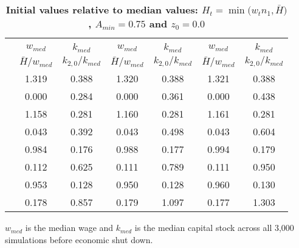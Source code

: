 \documentclass[letterpaper,12pt]{article}
\theoremstyle{definition}
\begin{document}
\begin{spacing}{1.5}
  \begin{table}[htbp]\centering\captionsetup{width=5.3in}
  \caption{\label{TabInitVal_A75}\textbf{Initial values relative to median values: $H_t = \min\bigl(w_t n_1, \bar{H}\bigr)$, $A_{min}=0.75$ and $z_0=0.0$}}
    \begin{threeparttable}
    \begin{tabular}{>{\small}c| >{\small}c >{\small}c| >{\small}c >{\small}c| >{\small}c >{\small}c}
      \hline\hline
      & \multicolumn{2}{c}{$k_{2,0}=0.11$} & \multicolumn{2}{c}{$k_{2,0}=0.14$} & \multicolumn{2}{c}{$k_{2,0}=0.17$} \\ \cline{2-7}
      & $w_{med}$ & $k_{med}$ & $w_{med}$ & $k_{med}$ & $w_{med}$ & $k_{med}$ \\
      & $\bar{H}/w_{med}$ & $k_{2,0}/k_{med}$ & $\bar{H}/w_{med}$ & $k_{2,0}/k_{med}$ & $\bar{H}/w_{med}$ & $k_{2,0}/k_{med}$ \\
      \hline
      \multirow{2}{*}{$\bar{H}=0.00$}
      & 1.319 & 0.388 & 1.320 & 0.388 & 1.321 & 0.388 \\
      & 0.000 & 0.284 & 0.000 & 0.361 & 0.000 & 0.438 \\
      \hline
      \multirow{2}{*}{$\bar{H}=0.05$}
      & 1.158 & 0.281 & 1.160 & 0.281 & 1.161 & 0.281 \\
      & 0.043 & 0.392 & 0.043 & 0.498 & 0.043 & 0.604 \\
      \hline
      \multirow{2}{*}{$\bar{H}=0.11$}
      & 0.984 & 0.176 & 0.988 & 0.177 & 0.994 & 0.179 \\
      & 0.112 & 0.625 & 0.111 & 0.789 & 0.111 & 0.950 \\
      \hline
      \multirow{2}{*}{$\bar{H}=0.17$}
      & 0.953 & 0.128 & 0.950 & 0.128 & 0.960 & 0.130 \\
      & 0.178 & 0.857 & 0.179 & 1.097 & 0.177 & 1.303 \\
      \hline\hline
    \end{tabular}
    \begin{tablenotes}
      \scriptsize{\item[]$w_{med}$ is the median wage and $k_{med}$ is the median capital stock across all 3,000 simulations before economic shut down.}
    \end{tablenotes}
    \end{threeparttable}
  \end{table}


\end{spacing}
\end{document}
